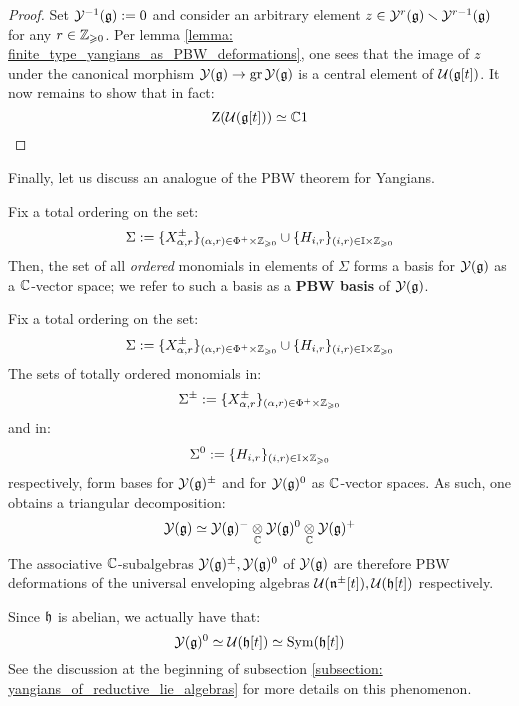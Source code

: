             \begin{proof}
                Set $\mathcal{Y}^{-1}(\mathfrak{g}) := 0$ and consider an arbitrary element $z \in \mathcal{Y}^r(\mathfrak{g}) \smallsetminus \mathcal{Y}^{r - 1}(\mathfrak{g})$ for any $r \in \mathbb{Z}_{\geqslant 0}$. Per lemma \ref{lemma: finite_type_yangians_as_PBW_deformations}, one sees that the image of $z$ under the canonical morphism $\mathcal{Y}(\mathfrak{g}) \to \operatorname{gr} \mathcal{Y}(\mathfrak{g})$ is a central element of $\mathcal{U}(\mathfrak{g}[t])$. It now remains to show that in fact:
                    $$\mathrm{Z}( \mathcal{U}(\mathfrak{g}[t]) ) \simeq \mathbb{C} 1$$
            \end{proof}

        Finally, let us discuss an analogue of the PBW theorem for Yangians.
        \begin{theorem} \label{theorem: PBW_bases_for_finite_type_yangians}
            \cite[Proposition 12.1.8]{chari_pressley_quantum_groups} Fix a total ordering on the set:
                $$\Sigma := \{X_{\alpha, r}^{\pm}\}_{(\alpha, r) \in \Phi^+ \x \Z_{\geq 0}} \cup \{H_{i, r}\}_{(i, r) \in \simpleroots \x \Z_{\geq 0}}$$
            Then, the set of all \textit{ordered} monomials in elements of $\Sigma$ forms a basis for $\mathcal{Y}(\mathfrak{g})$ as a $\mathbb{C}$-vector space; we refer to such a basis as a \textbf{PBW basis} of $\mathcal{Y}(\mathfrak{g})$. 
        \end{theorem}
        \begin{corollary} \label{coro: triangular_decompositions_of_finite_type_yangians}
            Fix a total ordering on the set:
                $$\Sigma := \{X_{\alpha, r}^{\pm}\}_{(\alpha, r) \in \Phi^+ \x \Z_{\geq 0}} \cup \{H_{i, r}\}_{(i, r) \in \simpleroots \x \Z_{\geq 0}}$$
            The sets of totally ordered monomials in:
                $$\Sigma^{\pm} := \{X_{\alpha, r}^{\pm}\}_{(\alpha, r) \in \Phi^+ \x \Z_{\geq 0}}$$
            and in:
                $$\Sigma^0 := \{H_{i, r}\}_{(i, r) \in \simpleroots \x \Z_{\geq 0}}$$
            respectively, form bases for $\mathcal{Y}(\mathfrak{g})^{\pm}$ and for $\mathcal{Y}(\mathfrak{g})^0$ as $\mathbb{C}$-vector spaces. As such, one obtains a triangular decomposition:
                $$\calY(\g) \cong \calY(\g)^- \tensor_{\bbC} \calY(\g)^0 \tensor_{\bbC} \calY(\g)^+$$
            The associative $\mathbb{C}$-subalgebras $\mathcal{Y}(\mathfrak{g})^{\pm}, \mathcal{Y}(\mathfrak{g})^0$ of $\mathcal{Y}(\mathfrak{g})$ are therefore PBW deformations of the universal enveloping algebras $\mathcal{U}(\mathfrak{n}^{\pm}[t]), \mathcal{U}(\mathfrak{h}[t])$ respectively. 
        \end{corollary}
        \begin{remark}
            Since $\mathfrak{h}$ is abelian, we actually have that:
                $$\mathcal{Y}(\mathfrak{g})^0 \simeq \mathcal{U}(\mathfrak{h}[t]) \simeq \mathrm{Sym}(\mathfrak{h}[t])$$
            See the discussion at the beginning of subsection \ref{subsection: yangians_of_reductive_lie_algebras} for more details on this phenomenon. 
        \end{remark}

